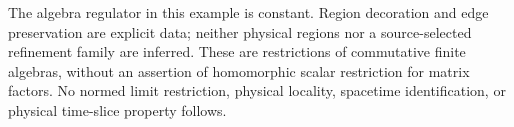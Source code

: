 The algebra regulator in this example is constant.  Region decoration and
edge preservation are explicit data; neither physical regions nor a
source-selected refinement family are inferred.  These are restrictions of
commutative finite algebras, without an assertion of homomorphic scalar
restriction for matrix factors.  No normed limit restriction, physical
locality, spacetime identification, or physical time-slice property follows.
